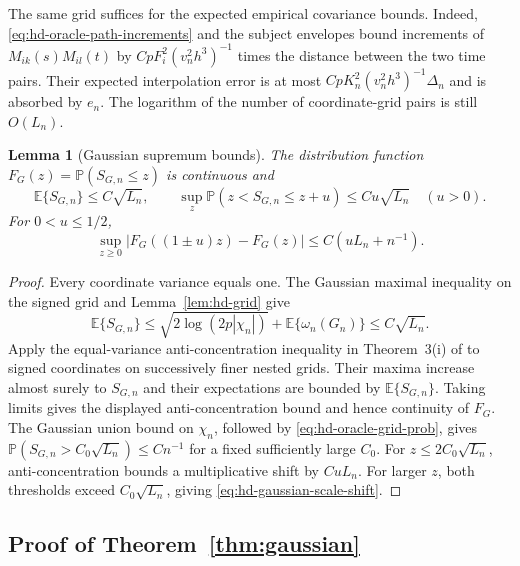 \documentclass[12pt]{article}
\newtheorem{lemma}{Lemma}
\newcommand{\expect}{\mathbb{E}}
\newcommand{\prob}{\mathbb{P}}
\numberwithin{equation}{section}
\begin{document}
The same grid suffices for the expected empirical covariance bounds.
Indeed, \eqref{eq:hd-oracle-path-increments} and the subject envelopes
bound increments of $M_{ik}(s)M_{il}(t)$ by
$CpF_i^2(v_n^2h^3)^{-1}$ times the distance between the two
time pairs. Their expected interpolation error is at most
$CpK_n^2(v_n^2h^3)^{-1}\Delta_n$ and is absorbed by $e_n$.
The logarithm of the number of coordinate-grid pairs is still $O(L_n)$.

\begin{lemma}[Gaussian supremum bounds]
\label{lem:hd-gaussian-supremum}
The distribution function $F_G(z)=\prob(S_{G,n}\le z)$ is continuous and
\[
 \expect\{S_{G,n}\}\le C\sqrt{L_n},\qquad
 \sup_z\prob(z<S_{G,n}\le z+u)\le Cu\sqrt{L_n}\quad(u>0).
\]
For $0<u\le1/2$,
\begin{equation}
 \sup_{z\ge0}|F_G((1\pm u)z)-F_G(z)|
 \le C(uL_n+n^{-1}).
 \label{eq:hd-gaussian-scale-shift}
\end{equation}
\end{lemma}

\begin{proof}
Every coordinate variance equals one. The Gaussian maximal inequality
on the signed grid and Lemma~\ref{lem:hd-grid} give
\[
\expect\{S_{G,n}\}\le\sqrt{2\log(2p|\chi_n|)}+\expect\{\omega_n(G_n)\}
 \le C\sqrt{L_n}.
\]
Apply the equal-variance anti-concentration inequality in Theorem~3(i)
of \citet{chernozhukov_comparison_2015} to signed coordinates on
successively finer nested grids. Their maxima increase almost surely
to $S_{G,n}$ and their expectations are bounded by $\expect\{S_{G,n}\}$.
Taking limits gives the displayed anti-concentration bound and hence
continuity of $F_G$.
The Gaussian union bound on $\chi_n$, followed by
\eqref{eq:hd-oracle-grid-prob}, gives
$\prob(S_{G,n}>C_0\sqrt{L_n})\le Cn^{-1}$ for a fixed sufficiently large
$C_0$. For $z\le2C_0\sqrt{L_n}$, anti-concentration bounds a
multiplicative shift by $CuL_n$. For larger $z$, both thresholds
exceed $C_0\sqrt{L_n}$, giving \eqref{eq:hd-gaussian-scale-shift}.
\end{proof}

\subsection{Proof of Theorem~\ref{thm:gaussian}}
\end{document}
